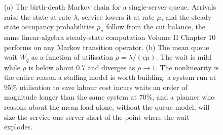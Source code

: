 \begin{figure}[htbp]
\caption[The M/M/c queue: state chain and the congestion
nonlinearity]{(a) The birth-death Markov chain for a single-server queue.
Arrivals raise the state at rate $\lambda$, service lowers it at rate
$\mu$, and the steady-state occupancy probabilities $p_n$ follow from the
cut balance, the same linear-algebra steady-state computation Volume II
Chapter 10 performs on any Markov transition operator. (b) The mean queue
wait $W_q$ as a function of utilisation $\rho = \lambda/(c\mu)$. The wait
is mild while $\rho$ is below about $0.7$ and diverges as $\rho \to 1$.
The nonlinearity is the entire reason a staffing model is worth building:
a system run at $95\%$ utilisation to save labour cost incurs waits an
order of magnitude longer than the same system at $70\%$, and a planner
who reasons about the mean load alone, without the queue model, will size
the service one server short of the point where the wait explodes.}
\label{fig:vol02:ch18:queue-state}
\end{figure}
